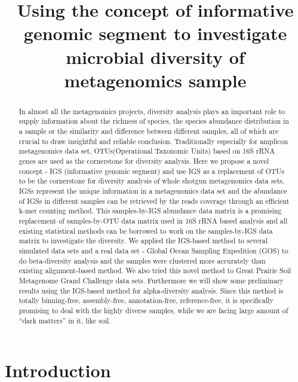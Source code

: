 \documentclass{article}
\begin{document}
\title{Using the concept of informative genomic segment to investigate 
microbial diversity of metagenomics sample}

\maketitle

\begin{abstract}

In almost all the metagenomics projects, diversity analysis plays an important
role to supply information about the richness of species, the species abundance
distribution in a sample or the similarity and difference between different 
samples, all of which are crucial to draw insightful and reliable conclusion. 
Traditionally especially for amplicon metagenomics data set, OTUs(Operational 
Taxonomic Units) based on 16S rRNA genes are used as the cornerstone for 
diversity analysis. Here we propose a novel concept - IGS (informative genomic 
segment) and use IGS as a replacement of OTUs to be the cornerstone for 
diversity analysis of whole shotgun metagenomics data sets. IGSs represent the 
unique information in a metagenomics data set and the abundance of IGSs in 
different samples can be retrieved by the reads coverage through an efficient 
k-mer counting method. This samples-by-IGS abundance data matrix is a promising
replacement of samples-by-OTU data matrix used in 16S rRNA based analysis and 
all existing statistical methods can be borrowed to work on the samples-by-IGS 
data matrix to investigate the diversity. We applied the IGS-based method to 
several simulated data sets and a real data set - Global Ocean Sampling 
Expedition (GOS) to do beta-diversity analysis and the samples were clustered 
more accurately than existing alignment-based method. We also tried this novel 
method to Great Prairie Soil Metagenome Grand Challenge data sets. Furthermore 
we will show some preliminary results using the IGS-based method for 
alpha-diversity analysis. Since this method is totally binning-free, 
assembly-free, annotation-free, reference-free, it is specifically promising 
to deal with the highly diverse samples, while we are facing large amount of 
“dark matters” in it, like soil.

\end{abstract}

\section{Introduction}
\end{document}
